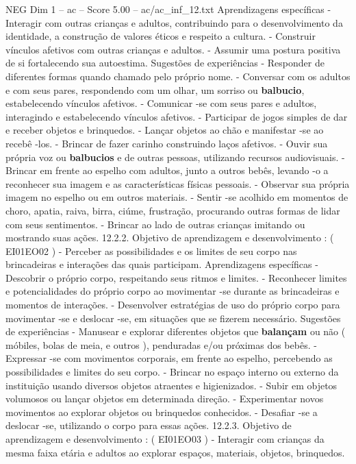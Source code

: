 \begin{textsample}{NEG Dim 1 – ac – Score 5.00 – ac/ac\_inf\_12.txt}
Aprendizagens específicas - Interagir com outras crianças e adultos, contribuindo para o desenvolvimento da identidade, a construção de valores éticos e respeito a cultura. - Construir vínculos afetivos com outras crianças e adultos. - Assumir uma postura positiva de si fortalecendo sua autoestima.
Sugestões de experiências - Responder de diferentes formas quando chamado pelo próprio nome. - Conversar com os adultos e com seus pares, respondendo com um olhar, um sorriso ou \textbf{balbucio}, estabelecendo vínculos afetivos. - Comunicar -se com seus pares e adultos, interagindo e estabelecendo vínculos afetivos. - Participar de jogos simples de dar e receber objetos e brinquedos. - Lançar objetos ao chão e manifestar -se ao recebê -los. - Brincar de fazer carinho construindo laços afetivos. - Ouvir sua própria voz ou \textbf{balbucios} e de outras pessoas, utilizando recursos audiovisuais. - Brincar em frente ao espelho com adultos, junto a outros bebês, levando -o a reconhecer sua imagem e as características físicas pessoais. - Observar sua própria imagem no espelho ou em outros materiais. - Sentir -se acolhido em momentos de choro, apatia, raiva, birra, ciúme, frustração, procurando outras formas de lidar com seus sentimentos. - Brincar ao lado de outras crianças imitando ou mostrando suas ações. 12.2.2.
Objetivo de aprendizagem e desenvolvimento : ( EI01EO02 ) - Perceber as possibilidades e os limites de seu corpo nas brincadeiras e interações das quais participam.
Aprendizagens específicas - Descobrir o próprio corpo, respeitando seus ritmos e limites. - Reconhecer limites e potencialidades do próprio corpo ao movimentar -se durante as brincadeiras e momentos de interações. - Desenvolver estratégias de uso do próprio corpo para movimentar -se e deslocar -se, em situações que se fizerem necessário.
Sugestões de experiências - Manusear e explorar diferentes objetos que \textbf{balançam} ou não ( móbiles, bolas de meia, e outros ), penduradas e/ou próximas dos bebês. - Expressar -se com movimentos corporais, em frente ao espelho, percebendo as possibilidades e limites do seu corpo. - Brincar no espaço interno ou externo da instituição usando diversos objetos atraentes e higienizados. - Subir em objetos volumosos ou lançar objetos em determinada direção. - Experimentar novos movimentos ao explorar objetos ou brinquedos conhecidos. - Desafiar -se a deslocar -se, utilizando o corpo para essas ações. 12.2.3.
Objetivo de aprendizagem e desenvolvimento : ( EI01EO03 ) - Interagir com crianças da mesma faixa etária e adultos ao explorar espaços, materiais, objetos, brinquedos.

\end{textsample}
